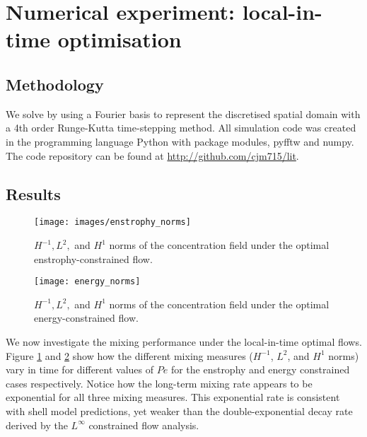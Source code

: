 \documentclass[12pt]{iopart}
\begin{document}
\section{Numerical experiment: local-in-time optimisation}
\label{sec:numerical_experiment}
\subsection{Methodology}

We solve  by using a Fourier basis to represent the discretised spatial domain with a 4th order Runge-Kutta time-stepping method. All simulation code was created in the programming language Python with package modules, pyfftw and numpy. The code repository can be found at \href{http://github.com/cjm715/lit}{ http://github.com/cjm715/lit}.




\subsection{Results}

\begin{figure}
\texttt{[image: images/enstrophy\_norms]}
\caption{$H^{-1}, L^{2},$ and $H^{1}$ norms of the concentration field under the optimal enstrophy-constrained flow.  }
\label{fig:enstrophy_norms}
\end{figure}
%
\begin{figure}
\texttt{[image: energy\_norms]}
\caption{$H^{-1}, L^{2},$ and $H^{1}$ norms of the concentration field under the optimal energy-constrained flow.}
\label{fig:energy_norms}
\end{figure}


We now investigate the mixing performance under the local-in-time optimal flows. Figure \ref{fig:enstrophy_norms} and \ref{fig:energy_norms} show how the different mixing measures ($H^{-1}$, $L^2$, and $H^{1}$ norms) vary in time for different values of $Pe$ for the enstrophy and energy constrained cases respectively. Notice how the long-term mixing rate appears to be exponential for all three mixing measures. This exponential rate is consistent with shell model predictions, yet weaker than the double-exponential decay rate derived by the $L^{\infty}$ constrained flow analysis.
\end{document}
